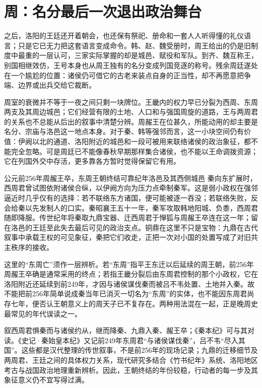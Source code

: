 \section{周：名分最后一次退出政治舞台}

之后，洛阳的王廷还开着朝会，也还保有祭祀、册命和一套人人听得懂的礼仪语言；只是它已无力把这套语言变成命令。韩、赵、魏受册时，周王给出的仍是旧制度中最重的一层认可，三家实际掌握的却是城邑、赋役和军队。到齐、魏互称王，别国相继效仿，王号本身也从周王独有的名分变成列国竞逐的称号。残余周廷遂处在一个尴尬的位置：诸侯仍可借它的古老来装点自身的正当性，却不再愿意把争端、边界或出兵交给它裁断。

周室的衰微并不等于一夜之间只剩一块牌位。王畿内的权力早已分裂为西周、东周两支及其周边城邑；它们经营有限的土地、人口和与强国周旋的道路，王与两周君的关系也不总能从后出的叙事中清楚分辨。周赧王在位甚久，所能动用的却主要是名分、宗庙与洛邑这一地点本身。对于秦、韩等强邻而言，这一小块空间仍有价值：伊阙以北的通道、洛阳附近的城邑和一段可被用来联络诸侯的政治象征，都不能完全忽略。可是周廷已不能像春秋早期那样集合诸侯，也不能以王命调拨资源；它在列国外交中存活，更多靠各方暂时觉得保留它有用。

\begin{event}{公元前256年}{周赧王卒，东周王朝终结}{可靠纪年}{洛邑及其西侧城邑}
秦向东扩展时，西周君曾试图依附诸侯合纵，以伊阙方向为压力点牵制秦军。这是弱小政权在强邻逼近时几乎仅有的选择：若不联络东方诸国，便可能被逐一吞没；若联络失败，反会给秦以先发制人的口实。秦昭襄王五十一年，秦军攻取韩地阳城、负黍，西周君随即降服。传世纪年将秦取九鼎宝器、迁西周君于惮狐与周赧王卒连在这一年；留在洛邑的王廷至此失去最后可见的政治支点。铜鼎在这里不只是宝物：九鼎在古代叙事中承载王权的可见象征，秦把它们收走，正把一次对小国的处置写成了对旧共主秩序的接收。
\end{event}

这里的“东周亡”须作一层辨析。若“东周”指平王东迁以后延续的周王朝，前256年周赧王卒确是通常采用的终点；若指王畿分裂后由东周君控制的那个小政权，它在洛阳附近还延续到前249年，才因与诸侯谋伐秦而被吕不韦处置、土地并入秦。故不能把前256年简单说成秦当年已消灭一切名为“东周”的实体，也不能因东周君尚存七年，便否认王朝意义上的周天子已不复存在。两种用法混在一起，正是晚周史最常见的年代误读之一。

\begin{sourcenote}[王朝终点与残余政权]
叙西周君惧秦而与诸侯约从，继而降秦、九鼎入秦、赧王卒；《秦本纪》可与其对读。《史记·秦始皇本纪》又记前249年东周君“与诸侯谋伐秦”，吕不韦“尽入其国”。这些都是汉代整理的传世叙事，不是前256年的现场记录；九鼎的迁移细节及两周君、王廷之间的具体权力关系，现代研究多结合《竹书纪年》系统、洛阳地区考古与战国政治地理重新辨析。因此，王朝终结的年份较稳，行动者的每一步及其象征意义仍不宜写得过满。
\end{sourcenote}

